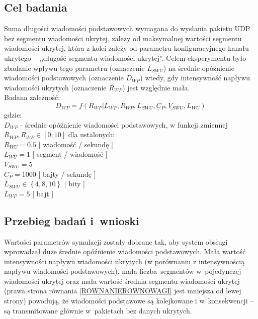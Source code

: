 \documentclass[a4paper, twoside, 12pt]{report}
\begin{document}
        \subsection{Cel badania}
            Suma długości wiadomości podstawowych wymagana do wysłania pakietu UDP
            bez segmentu wiadomości ukrytej,
            zależy od maksymalnej wartości segmentu wiadomości ukrytej, która
            z kolei zależy od parametru konfiguracyjnego kanału ukrytego -- ,,długość segmentu wiadomości ukrytej''.
            Celem eksperymentu było zbadanie wpływu tego parametru (oznaczenie \(L_{SWU}\))
            na średnie opóźnienie wiadomości podstawowych (oznaczenie \( D_{WP} \))
            wtedy, gdy intensywność napływu wiadomości ukrytych (oznaczenie \( R_{WP} \)) jest względnie mała.
            \\
            Badana zależność: \\
                $$ D_{WP} = f(R_{WP} | L_{WP}, R_{WP}, L_{SWU}, C_P, V_{SWU}, L_{WU}) $$
            gdzie: \\
                \( D_{WP} \) - średnie opóźnienie wiadomości podstawowych, w funkcji zmiennej \( R_{WP}, R_{WP} \in [0;10] \)
           dla ustalonych: \\
                \( R_{WU} = 0.5 \) [ wiadomość / sekundę ]\\
                \( L_{WU} = 1 \) [ segment / wiadomość ]\\
                \( V_{SWU} = 5 \)\\
                \( C_P = 1000 \) [ bajty / sekundę ]\\
                \( L_{SWU} \in \left\{4, 8, 10\right\}\) [ bity ]\\
                \( L_{WP} = 5 \) [ bajt ]\\
        \subsection{Przebieg badań i~wnioski}
            Wartości parametrów symulacji zostały dobrane tak, aby system obsługi
            wprowadzał duże średnie opóźnienie wiadomości podstawowych. Mała wartość intensywności
            napływu wiadomości ukrytych (w porównaniu z intensywnością napływu wiadomości podstawowych),
            mała liczba segmentów w~pojedynczej
            wiadomości ukrytej oraz mała wartość średnia segmentu
            wiadomości ukrytej (prawa strona równania \ref{ROWNANIEROWNOWAGI} jest mniejsza od lewej strony)
            powodują, że wiadomości podstawowe są kolejkowane i
            w~konsekwencji -- są transmitowane głównie w~pakietach bez danych ukrytych.
\end{document}
